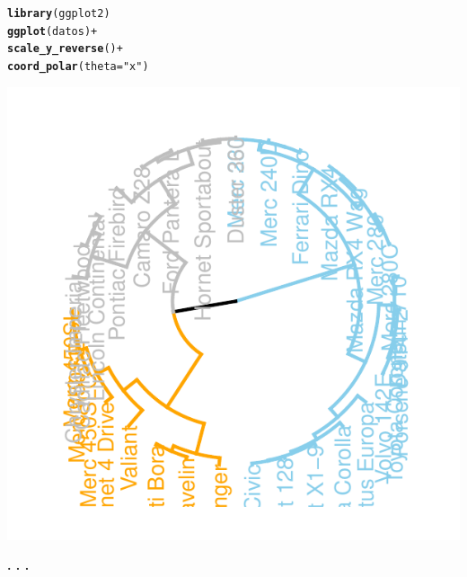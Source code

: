\documentclass{article}\usepackage[]{graphicx}\usepackage[]{color}
\makeatletter
\def\maxwidth{ %
  \ifdim\Gin@nat@width>\linewidth
    \linewidth
  \else
    \Gin@nat@width
  \fi
}
\newcommand{\hlstr}[1]{\textcolor[rgb]{0.192,0.494,0.8}{#1}}%
\newcommand{\hlopt}[1]{\textcolor[rgb]{0,0,0}{#1}}%
\newcommand{\hlstd}[1]{\textcolor[rgb]{0.345,0.345,0.345}{#1}}%
\newcommand{\hlkwc}[1]{\textcolor[rgb]{0.333,0.667,0.333}{#1}}%
\newcommand{\hlkwd}[1]{\textcolor[rgb]{0.737,0.353,0.396}{\textbf{#1}}}%
\newenvironment{kframe}{%
 \def\at@end@of@kframe{}%
 \ifinner\ifhmode%
  \def\at@end@of@kframe{\end{minipage}}%
  \begin{minipage}{\columnwidth}%
 \fi\fi%
 \def\FrameCommand##1{\hskip\@totalleftmargin \hskip-\fboxsep
 \colorbox{shadecolor}{##1}\hskip-\fboxsep
     \hskip-\linewidth \hskip-\@totalleftmargin \hskip\columnwidth}%
 \MakeFramed {\advance\hsize-\width
   \@totalleftmargin\z@ \linewidth\hsize
   \@setminipage}}%
 {\par\unskip\endMakeFramed%
 \at@end@of@kframe}
\newenvironment{knitrout}{}{} %
\makeatother
\begin{document}
\begin{knitrout}
\color{fgcolor}\begin{kframe}
\begin{alltt}
\hlkwd{library}\hlstd{(ggplot2)}
\hlkwd{ggplot}\hlstd{(datos)} \hlopt{+}
    \hlkwd{scale_y_reverse}\hlstd{()} \hlopt{+}
    \hlkwd{coord_polar}\hlstd{(}\hlkwc{theta} \hlstd{=} \hlstr{"x"}\hlstd{)}
\end{alltt}
\end{kframe}

{\centering \includegraphics[width=\maxwidth]{figure/plot_dendo_ggplot2-1} 

}



\end{knitrout}
\begin{center}
\textbf{. . .}
\end{center}
\end{document}
